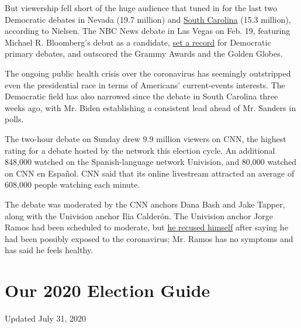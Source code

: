 But viewership fell short of the huge audience that tuned in for the
last two Democratic debates in Nevada (19.7 million) and
\href{https://www.nytimes.com/2020/02/26/business/media/democratic-debate-cbs-ratings.html}{South
Carolina} (15.3 million), according to Nielsen. The NBC News debate in
Las Vegas on Feb. 19, featuring Michael R. Bloomberg's debut as a
candidate,
\href{https://www.nytimes.com/2020/02/20/business/media/democratic-debate-las-vegas.html}{set
a record} for Democratic primary debates, and outscored the Grammy
Awards and the Golden Globes.

The ongoing public health crisis over the coronavirus has seemingly
outstripped even the presidential race in terms of Americans'
current-events interests. The Democratic field has also narrowed since
the debate in South Carolina three weeks ago, with Mr. Biden
establishing a consistent lead ahead of Mr. Sanders in polls.

The two-hour debate on Sunday drew 9.9 million viewers on CNN, the
highest rating for a debate hosted by the network this election cycle.
An additional 848,000 watched on the Spanish-language network Univision,
and 80,000 watched on CNN en Español. CNN said that its online
livestream attracted an average of 608,000 people watching each minute.

The debate was moderated by the CNN anchors Dana Bash and Jake Tapper,
along with the Univision anchor Ilia Calderón. The Univision anchor
Jorge Ramos had been scheduled to moderate, but
\href{https://www.nytimes.com/2020/03/15/us/politics/cnn-democratic-debate-coronavirus.html}{he
recused himself} after saying he had been possibly exposed to the
coronavirus; Mr. Ramos has no symptoms and has said he feels healthy.

\hypertarget{our-2020-election-guide}{%
\section{Our 2020 Election Guide}\label{our-2020-election-guide}}

Updated July 31, 2020

